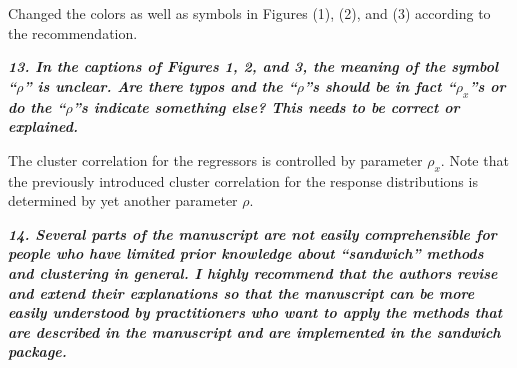 \documentclass[10pt,a4paper]{article}
\begin{document}
\medskip

Changed the colors as well as symbols in Figures (1), (2), and (3) according to the recommendation.

\medskip

\textbf{\textit{13. In the captions of Figures 1, 2, and 3, the meaning of the symbol ``$\rho$'' is unclear. Are
there typos and the ``$\rho$''s should be in fact ``$\rho_x$''s or do the ``$\rho$''s indicate something else?
This needs to be correct or explained.}}

\medskip

The cluster correlation for the regressors is controlled by parameter $\rho_x$. Note that the previously introduced cluster correlation for the response distributions is determined by yet another parameter $\rho$.

\medskip

\textbf{\textit{14. Several parts of the manuscript are not easily comprehensible for people who have limited
prior knowledge about ``sandwich'' methods and clustering in general. I highly recommend
that the authors revise and extend their explanations so that the manuscript can be more
easily understood by practitioners who want to apply the methods that are described in
the manuscript and are implemented in the sandwich package.}}
\end{document}
